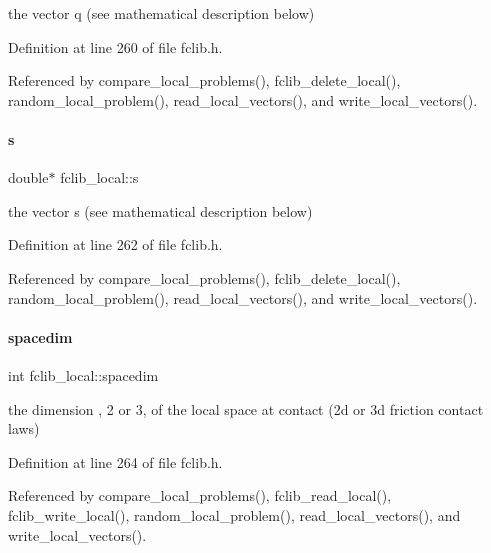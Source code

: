 the vector q (see mathematical description below) 



Definition at line 260 of file fclib.\+h.



Referenced by compare\+\_\+local\+\_\+problems(), fclib\+\_\+delete\+\_\+local(), random\+\_\+local\+\_\+problem(), read\+\_\+local\+\_\+vectors(), and write\+\_\+local\+\_\+vectors().

\mbox{\label{structfclib__local_abb6b3a07d92a86aac1c38e4d847207e3}} 
\paragraph{\texorpdfstring{s}{s}}
{\footnotesize\ttfamily double$\ast$ fclib\+\_\+local\+::s}



the vector s (see mathematical description below) 



Definition at line 262 of file fclib.\+h.



Referenced by compare\+\_\+local\+\_\+problems(), fclib\+\_\+delete\+\_\+local(), random\+\_\+local\+\_\+problem(), read\+\_\+local\+\_\+vectors(), and write\+\_\+local\+\_\+vectors().

\mbox{\label{structfclib__local_accf07018913652e57be3a661b25d8bb7}} 
\paragraph{\texorpdfstring{spacedim}{spacedim}}
{\footnotesize\ttfamily int fclib\+\_\+local\+::spacedim}



the dimension , 2 or 3, of the local space at contact (2d or 3d friction contact laws) 



Definition at line 264 of file fclib.\+h.



Referenced by compare\+\_\+local\+\_\+problems(), fclib\+\_\+read\+\_\+local(), fclib\+\_\+write\+\_\+local(), random\+\_\+local\+\_\+problem(), read\+\_\+local\+\_\+vectors(), and write\+\_\+local\+\_\+vectors().

